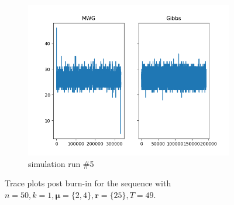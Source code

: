 \begin{figure}[H]
\begin{subfigure}{.3\textwidth}
    	\includegraphics[width=\linewidth]{../../plots/Trace_post_burnin_M2_N50_NMCMC1_seed4_diffind2.png}
    	\caption{simulation run \#5}
	\end{subfigure}
	\caption{Trace plots post burn-in for the sequence with $n=50, k=1, \bm{\mu} = \{2,4\},\bm{r} = \{25\}, T=49$.}
\end{figure}

